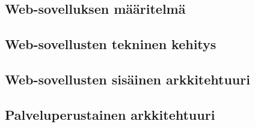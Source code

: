 
\subsection{Web-sovelluksen määritelmä}

\subsection{Web-sovellusten tekninen kehitys}

\subsection{Web-sovellusten sisäinen arkkitehtuuri}

\subsection{Palveluperustainen arkkitehtuuri}
